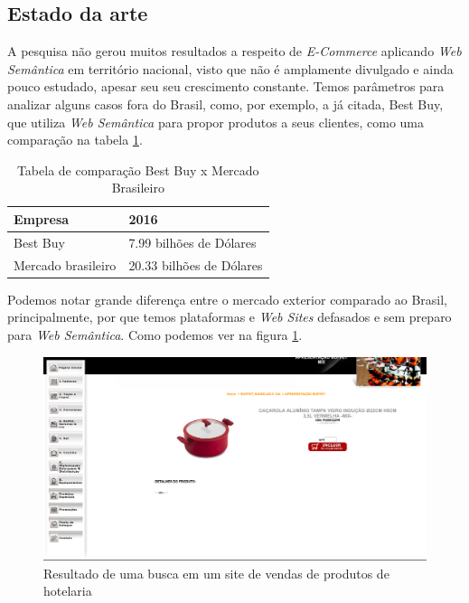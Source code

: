 \subsection{Estado da arte}
	A pesquisa não gerou muitos resultados a respeito de \textit{E-Commerce} aplicando \textit{Web Semântica} em território nacional, visto que não é amplamente divulgado e ainda pouco estudado, apesar seu seu crescimento constante. Temos parâmetros para analizar alguns casos fora do Brasil, como, por exemplo, a já citada, Best Buy, que utiliza  \textit{Web Semântica} para propor produtos a seus clientes, como uma comparação na tabela \ref{tab01}.
	\begin{table}[h]
		\centering
		\caption{Tabela de comparação Best Buy x Mercado Brasileiro}
		\label{tab01}
		\begin{tabular}{|l|l|}
			\hline
			Empresa            & 2016                     \\ \hline
			Best Buy           & 7.99 bilhões de Dólares  \\ \hline
			Mercado brasileiro & 20.33 bilhões de Dólares \\ \hline
		\end{tabular}
	\end{table}

Podemos notar grande diferença entre o mercado exterior comparado ao Brasil, principalmente, por que temos plataformas e \textit{Web Sites} defasados e sem preparo para \textit{Web Semântica}.
Como podemos ver na figura \ref{fig05}.

	\begin{figure}[h]
		\centering
		\includegraphics[keepaspectratio=true,scale=0.3]{figuras/SchipperProduto.png}
		\caption{Resultado de uma busca em um site de vendas de produtos de hotelaria}
		\label{fig05}
	\end{figure}

